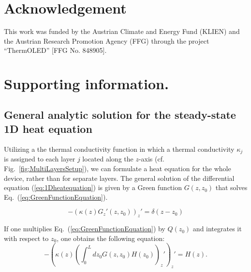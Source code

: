 \documentclass[%
9pt,
 aip,
rsi,%
 amsmath,amssymb,
preprint,%
]{revtex4-1}
\begin{document}
\section{Acknowledgement}
This work was funded by the Austrian Climate and Energy Fund (KLIEN) and the Austrian Research Promotion Agency (FFG) through the project “ThermOLED” [FFG No. 848905].

\clearpage

\clearpage

\section*{Supporting information.}

\subsection*{General analytic solution for the steady-state 1D heat equation}


Utilizing a the thermal conductivity function  in which a thermal conductivity $\kappa_j$ is assigned to each layer $j$ located along the $z$-axis (cf. Fig.~\ref{fig:MultiLayersSetup}), we can formulate a heat equation for the whole device, rather than for separate layers. The general solution of the differential equation (\ref{eq:1Dheatequation}) is given by a Green function $G(z,z_0)$ that solves Eq.~(\ref{eq:GreenFunctionEquation}). 

\begin{equation}
	-\left( \kappa(z) G_z'(z,z_0)  \right)_z' = \delta(z-z_0)
    \label{eq:GreenFunctionEquation}
\end{equation}

If one multiplies Eq.~(\ref{eq:GreenFunctionEquation}) by $Q(z_0)$ and integrates it with respect to $z_0$, one obtains the following equation: %
\begin{equation}
	-{\left(\kappa (z) \left(\int_0^L dz_0 G(z,z_0) H(z_0) \right)_z' \right)}_z' = H(z).
	\label{eq:GreenFunctionHeatEquation}
\end{equation}
\end{document}
